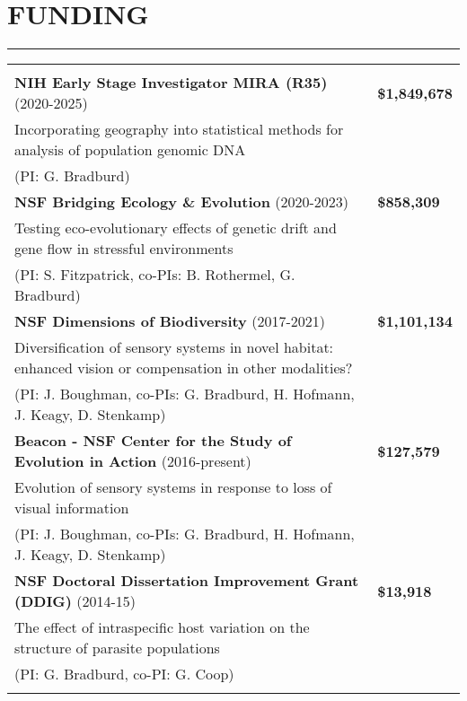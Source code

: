 \documentclass{article}
\begin{document}
\section*{FUNDING}
\vspace{-0.6cm}
\rule{470pt}{0.4pt}
\begin{tabular}{>{\everypar{\hangindent1cm}}p{}p{}}
\hfill\\
%
\textbf{NIH Early Stage Investigator MIRA (R35)} (2020-2025) & \hfill \textbf{\$1,849,678} \\
\hspace{4.5mm} Incorporating geography into statistical methods for analysis of population genomic DNA\\
\hspace{4.5mm}(PI: G. Bradburd)\\ \vspace{-0.1cm}
%
\textbf{NSF Bridging Ecology \& Evolution} (2020-2023) & \hfill \textbf{\$858,309} \\
\hspace{4.5mm} Testing eco-evolutionary effects of genetic drift and gene flow in stressful environments\\
\hspace{4.5mm}(PI: S. Fitzpatrick, co-PIs: B. Rothermel, G. Bradburd)\\ \vspace{-0.1cm}
%
\textbf{NSF Dimensions of Biodiversity} (2017-2021) & \hfill \textbf{\$1,101,134} \\
\hspace{4.5mm}Diversification of sensory systems in novel habitat: enhanced vision or compensation in other modalities?\\
\hspace{4.5mm}(PI: J. Boughman, co-PIs: G. Bradburd, H. Hofmann, J. Keagy, D. Stenkamp)\\ \vspace{-0.1cm}
%
\textbf{Beacon - NSF Center for the Study of Evolution in Action} (2016-present) & \hfill \textbf{\$127,579}\\
\hspace{4.5mm}Evolution of sensory systems in response to loss of visual information\\
\hspace{4.5mm}(PI: J. Boughman, co-PIs: G. Bradburd, H. Hofmann, J. Keagy, D. Stenkamp)\\ \vspace{-0.1cm}
%
\textbf{NSF Doctoral Dissertation Improvement Grant (DDIG)} (2014-15) & \hfill \textbf{\$13,918}\\
\hspace{4.5mm}The effect of intraspecific host variation on the structure of parasite populations\\
\hspace{4.5mm}(PI: G. Bradburd, co-PI: G. Coop)\\ \vspace{-0.1cm}
\end{tabular}
%
\newpage
\end{document}
